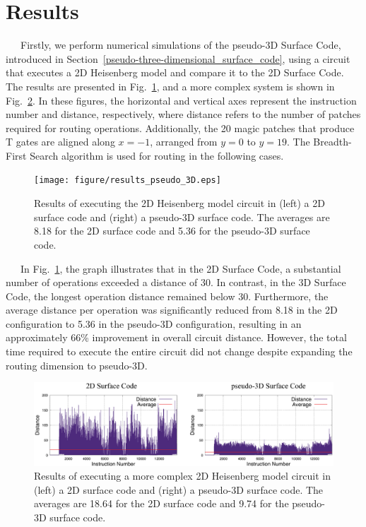\documentclass[a4paper,11pt]{ltjsarticle}
\begin{document}
\section{Results}\label{results}{
    \ \ \ Firstly, we perform numerical simulations of the pseudo-3D Surface Code, introduced in Section~\ref{pseudo-three-dimensional_surface_code}, using a circuit that executes a 2D Heisenberg model and compare it to the 2D Surface Code. The results are presented in Fig.~\ref{results_of_pseudo_3D}, and a more complex system is shown in Fig.~\ref{results_of_pseudo_3D_1}. In these figures, the horizontal and vertical axes represent the instruction number and distance, respectively, where distance refers to the number of patches required for routing operations. Additionally, the 20 magic patches that produce T gates are aligned along $x = -1$, arranged from $y = 0$ to $y = 19$. The Breadth-First Search algorithm is used for routing in the following cases.

    \begin{figure}[h]
        \centering
        \texttt{[image: figure/results\_pseudo\_3D.eps]}
        \vspace{-20pt}\caption{Results of executing the 2D Heisenberg model circuit in (left) a 2D surface code and (right) a pseudo-3D surface code. The averages are 8.18 for the 2D surface code and 5.36 for the pseudo-3D surface code.}
        \label{results_of_pseudo_3D}
    \end{figure}

    \ \ \ In Fig.~\ref{results_of_pseudo_3D}, the graph illustrates that in the 2D Surface Code, a substantial number of operations exceeded a distance of 30. In contrast, in the 3D Surface Code, the longest operation distance remained below 30. Furthermore, the average distance per operation was significantly reduced from 8.18 in the 2D configuration to 5.36 in the pseudo-3D configuration, resulting in an approximately 66\% improvement in overall circuit distance. However, the total time required to execute the entire circuit did not change despite expanding the routing dimension to pseudo-3D.

    \begin{figure}[h]
        \centering
        \includegraphics[scale=0.5]{figure/results_pseudo_3D_1.eps}
        \vspace{-20pt}\caption{Results of executing a more complex 2D Heisenberg model circuit in (left) a 2D surface code and (right) a pseudo-3D surface code. The averages are 18.64 for the 2D surface code and 9.74 for the pseudo-3D surface code.}
        \label{results_of_pseudo_3D_1}
    \end{figure}

}
\end{document}
